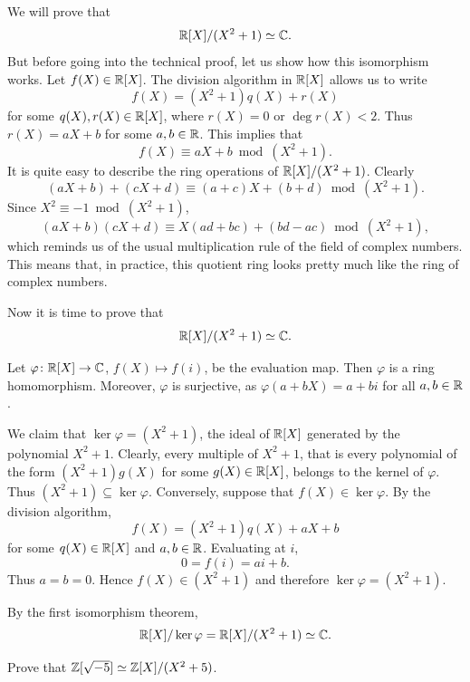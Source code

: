 \begin{example}
    We will prove that 
	\[
	\mathbb{R}[X]/(X^2+1)\simeq\mathbb{C}. 
	\]
    But before going into the technical proof, let us show how this
    isomorphism works. 
    Let $f(X)\in\mathbb{R}[X]$. 
	The division algorithm in $\mathbb{R}[X]$ allows us to write
	\[
	f(X)=(X^2+1)q(X)+r(X)
	\]
	for some $q(X),r(X)\in\mathbb{R}[X]$, where $r(X)=0$ or $\deg r(X)<2$. Thus
	$r(X)=aX+b$ for some $a,b\in\mathbb{R}$. This implies that
	\[
	f(X)\equiv aX+b\bmod (X^2+1).
	\] 
	It is quite easy to describe the ring operations of 
	$\mathbb{R}[X]/(X^2+1)$. Clearly 
	\[
	(aX+b)+(cX+d)\equiv (a+c)X+(b+d)\bmod (X^2+1).
	\]
	Since $X^2\equiv -1\bmod (X^2+1)$,   	
	\[
	(aX+b)(cX+d)\equiv X(ad+bc)+(bd-ac)\bmod (X^2+1), 
	\]
	which reminds us of the usual 
	multiplication rule of the field of complex numbers. This means that, in practice, 
	this quotient ring looks pretty much like the ring of 
	complex numbers.

    Now it is time to prove that
	\[
		\mathbb{R}[X]/(X^2+1)\simeq\mathbb{C}. 
	\] 

    Let $\varphi\colon \mathbb{R}[X]\to\mathbb{C}$, $f(X)\mapsto f(i)$, be the evaluation map. Then
    $\varphi$ is a ring homomorphism. Moreover, $\varphi$ is surjective, as
    $\varphi(a+bX)=a+bi$ for all $a,b\in\mathbb{R}$. 
	
	We claim that $\ker\varphi=(X^2+1)$, the ideal
	of $\mathbb{R}[X]$ generated by the polynomial $X^2+1$.  
    Clearly, every multiple of $X^2+1$, that is every polynomial
    of the form $(X^2+1)g(X)$ for some $g(X)\in\mathbb{R}[X]$, belongs to the kernel of $\varphi$. 
    Thus $(X^2+1)\subseteq\ker\varphi$. 
    Conversely, suppose that $f(X)\in\ker\varphi$. By the division
    algorithm, 
    \[
    f(X)=(X^2+1)q(X)+aX+b
    \]
    for some $q(X)\in\mathbb{R}[X]$ and $a,b\in\mathbb{R}$. 
    Evaluating at $i$,
    \[
    0=f(i)=ai+b.
    \]
    Thus $a=b=0$. Hence
    $f(X)\in(X^2+1)$ and therefore
    $\ker\varphi=(X^2+1)$.

	
	By the first 
    isomorphism theorem, 
    \[
	\mathbb{R}[X]/\ker\varphi=\mathbb{R}[X]/(X^2+1)\simeq\mathbb{C}.
	\] 
\end{example}

\begin{exercise}
\label{xca:ring_iso}
	Prove that $\mathbb{Z}[\sqrt{-5}]\simeq\mathbb{Z}[X]/(X^2+5)$. 	
\end{exercise}

